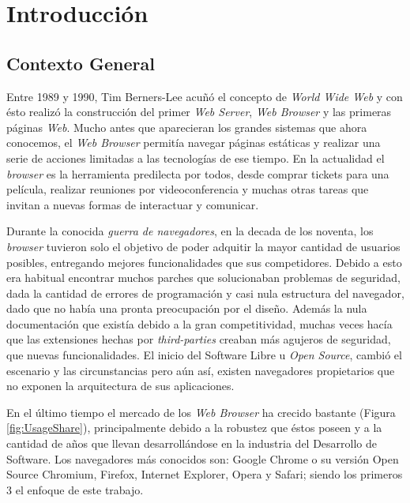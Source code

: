 


\chapter{Introducción}
\label{chap1:intro}

\section{Contexto General}
\label{chap1:CG}

Entre 1989 y 1990, Tim Berners-Lee acuñó el concepto de \textit{World Wide Web} y con ésto realizó la construcción del primer \textit{Web Server}, \textit{Web Browser} y las primeras páginas \textit{Web}. Mucho antes que aparecieran los grandes sistemas que ahora conocemos, el \textit{Web Browser} permitía navegar páginas estáticas y realizar una serie de acciones limitadas a las tecnologías de ese tiempo. En la actualidad el \textit{browser} es la herramienta predilecta por todos, desde comprar tickets para una película, realizar reuniones por videoconferencia y muchas otras tareas que invitan a nuevas formas de interactuar y comunicar.

Durante la conocida \textit{guerra de navegadores}, en la decada de los noventa, los \textit{browser} tuvieron solo el objetivo de poder adquitir la mayor cantidad de usuarios posibles, entregando mejores funcionalidades que sus competidores. Debido a esto era habitual encontrar muchos parches que solucionaban problemas de seguridad, dada la cantidad de errores de programación y casi nula estructura del navegador, dado que no había una pronta preocupación por el diseño. Además la nula documentación que existía debido a la gran competitividad, muchas veces hacía que las extensiones hechas por \textit{third-parties} creaban más agujeros de seguridad, que nuevas funcionalidades. El inicio del Software Libre u \textit{Open Source}, cambió el escenario y las circunstancias pero aún así, existen navegadores propietarios que no exponen la arquitectura de sus aplicaciones.

En el último tiempo el mercado de los \textit{Web Browser} ha crecido bastante (Figura \ref{fig:UsageShare}), principalmente debido a la robustez que éstos poseen y a la cantidad de años que llevan desarrollándose en la industria del Desarrollo de Software. Los navegadores más conocidos son: Google Chrome o su versión Open Source Chromium, Firefox, Internet Explorer, Opera y Safari; siendo los primeros 3 el enfoque de este trabajo.

